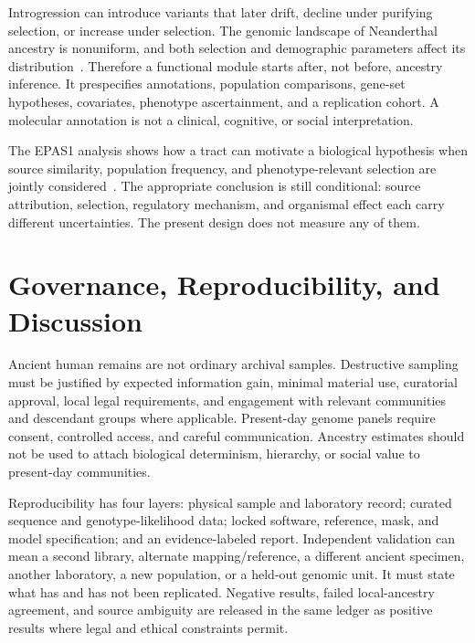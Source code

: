\documentclass[conference]{IEEEtran}
\begin{document}
Introgression can introduce variants that later drift, decline under purifying selection, or increase under selection. The genomic landscape of Neanderthal ancestry is nonuniform, and both selection and demographic parameters affect its distribution~\cite{sankararaman2014,juric2016}. Therefore a functional module starts after, not before, ancestry inference. It prespecifies annotations, population comparisons, gene-set hypotheses, covariates, phenotype ascertainment, and a replication cohort. A molecular annotation is not a clinical, cognitive, or social interpretation.

The EPAS1 analysis shows how a tract can motivate a biological hypothesis when source similarity, population frequency, and phenotype-relevant selection are jointly considered~\cite{huerta2014}. The appropriate conclusion is still conditional: source attribution, selection, regulatory mechanism, and organismal effect each carry different uncertainties. The present design does not measure any of them.

\section{Governance, Reproducibility, and Discussion}

Ancient human remains are not ordinary archival samples. Destructive sampling must be justified by expected information gain, minimal material use, curatorial approval, local legal requirements, and engagement with relevant communities and descendant groups where applicable. Present-day genome panels require consent, controlled access, and careful communication. Ancestry estimates should not be used to attach biological determinism, hierarchy, or social value to present-day communities.

Reproducibility has four layers: physical sample and laboratory record; curated sequence and genotype-likelihood data; locked software, reference, mask, and model specification; and an evidence-labeled report. Independent validation can mean a second library, alternate mapping/reference, a different ancient specimen, another laboratory, a new population, or a held-out genomic unit. It must state what has and has not been replicated. Negative results, failed local-ancestry agreement, and source ambiguity are released in the same ledger as positive results where legal and ethical constraints permit.
\end{document}
